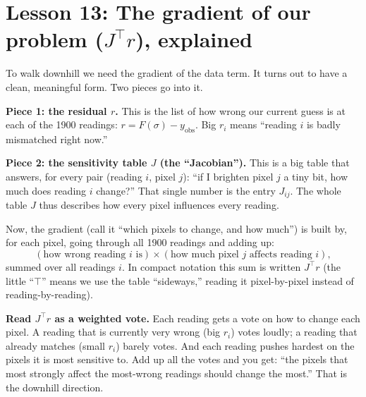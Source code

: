 \documentclass[11pt]{article}
\begin{document}
\section{Lesson 13: The gradient of our problem ($J^\top r$), explained}

To walk downhill we need the gradient of the data term. It turns out to have a
clean, meaningful form. Two pieces go into it.

\textbf{Piece 1: the residual $r$.} This is the list of how wrong our current
guess is at each of the 1900 readings: $r = F(\sigma) - y_{\text{obs}}$. Big
$r_i$ means ``reading $i$ is badly mismatched right now.''

\textbf{Piece 2: the sensitivity table $J$ (the ``Jacobian'').} This is a big
table that answers, for every pair (reading $i$, pixel $j$): ``if I brighten
pixel $j$ a tiny bit, how much does reading $i$ change?'' That single number
is the entry $J_{ij}$. The whole table $J$ thus describes how every pixel
influences every reading.

Now, the gradient (call it ``which pixels to change, and how much'') is built
by, for each pixel, going through all 1900 readings and adding up:
\[
(\text{how wrong reading } i \text{ is}) \times
(\text{how much pixel } j \text{ affects reading } i),
\]
summed over all readings $i$. In compact notation this sum is written
$J^\top r$ (the little ``$\top$'' means we use the table ``sideways,'' reading
it pixel-by-pixel instead of reading-by-reading).

\begin{intuition}
\textbf{Read $J^\top r$ as a weighted vote.} Each reading gets a vote on how to
change each pixel. A reading that is currently very wrong (big $r_i$) votes
loudly; a reading that already matches (small $r_i$) barely votes. And each
reading pushes hardest on the pixels it is most sensitive to. Add up all the
votes and you get: ``the pixels that most strongly affect the most-wrong
readings should change the most.'' That is the downhill direction.
\end{intuition}
\end{document}
